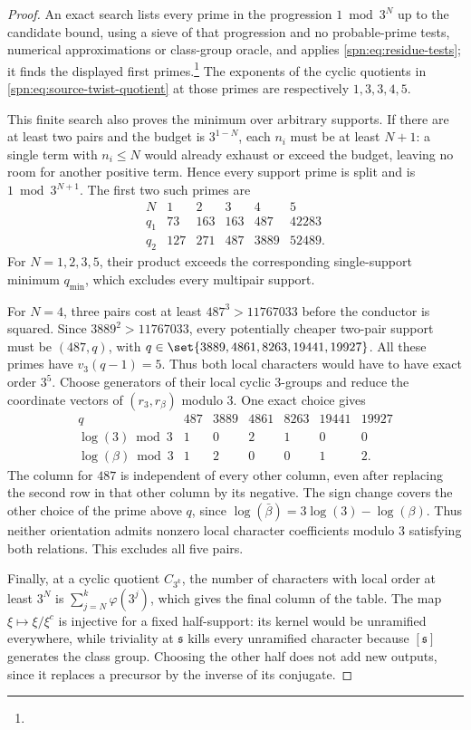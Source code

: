 \begin{proof}
An exact search lists every prime in the progression $1\bmod3^N$ up to the
candidate bound, using a sieve of that progression and no probable-prime
tests, numerical approximations or class-group oracle, and applies
\eqref{spn:eq:residue-tests}; it finds the displayed first
primes.\footnote{}
The exponents of the cyclic quotients in
\eqref{spn:eq:source-twist-quotient} at those primes are respectively
$1,3,3,4,5$.

This finite search also proves the minimum over arbitrary supports. If there
are at least two pairs and the budget is $3^{1-N}$, each $n_i$ must be at
least $N+1$: a single term with $n_i\le N$ would already exhaust or exceed
the budget, leaving no room for another positive term. Hence every support
prime is split and is $1\bmod3^{N+1}$. The first two such primes are
\[
\begin{array}{c|rrrrr}
N&1&2&3&4&5\\ \hline
q_1&73&163&163&487&42283\\
q_2&127&271&487&3889&52489.
\end{array}
\]
For $N=1,2,3,5$, their product exceeds the corresponding single-support
minimum $q_{\min}$, which excludes every multipair support.

For $N=4$, three pairs cost at least $487^3>11767033$ before the conductor is
squared. Since $3889^2>11767033$, every potentially cheaper two-pair support
must be $(487,q)$, with $q\in\set{3889,4861,8263,19441,19927}$. All these
primes have $v_3(q-1)=5$. Thus both local characters would have to have exact
order $3^5$. Choose generators of their local cyclic $3$-groups and reduce
the coordinate vectors of $(r_3,r_\beta)$ modulo $3$. One exact choice gives
\[
\begin{array}{c|rrrrrr}
q&487&3889&4861&8263&19441&19927\\ \hline
\log(3)\bmod3&1&0&2&1&0&0\\
\log(\beta)\bmod3&1&2&0&0&1&2.
\end{array}
\]
The column for $487$ is independent of every other column, even after
replacing the second row in that other column by its negative. The sign
change covers the other choice of the prime above $q$, since
$\log(\bar\beta)=3\log(3)-\log(\beta)$. Thus neither orientation admits
nonzero local character coefficients modulo $3$ satisfying both relations.
This excludes all five pairs.

Finally, at a cyclic quotient $C_{3^k}$, the number of characters with local
order at least $3^N$ is $\sum_{j=N}^{k}\varphi(3^j)$, which gives the final
column of the table. The map $\xi\mapsto\xi/\xi^c$ is injective for a fixed
half-support: its kernel would be unramified everywhere, while triviality at
$\mathfrak s$ kills every unramified character because $[\mathfrak s]$
generates the class group. Choosing the other half does not add new outputs,
since it replaces a precursor by the inverse of its conjugate.
\end{proof}

